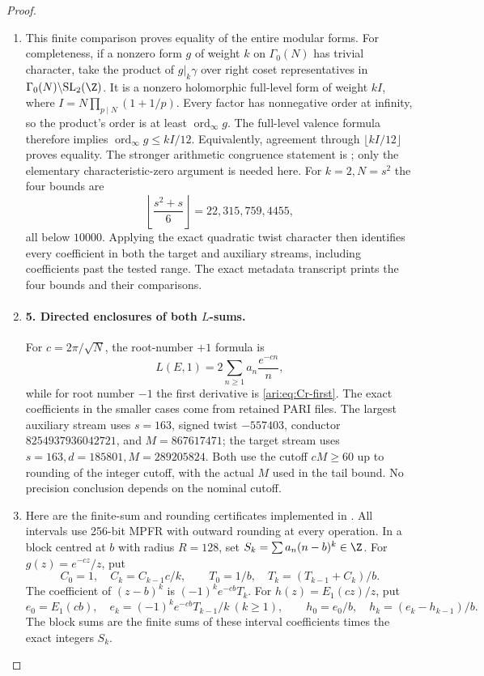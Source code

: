 \begin{proof}
\begin{enumerate}[label=\arabic*.,leftmargin=*]
\item This finite comparison proves equality of the entire modular forms.
For completeness, if a nonzero form $g$ of weight $k$ on
$\Gamma_0(N)$ has trivial character, take the product of
$g|_k\gamma$ over right coset representatives in
$\Gamma_0(N)\backslash\mathrm{SL}_2(\Z)$. It is a nonzero
holomorphic full-level form of weight $kI$, where
$I=N\prod_{p\mid N}(1+1/p)$. Every factor has nonnegative
order at infinity, so the product's order is at least
$\operatorname{ord}_\infty g$. The full-level valence formula
therefore implies $\operatorname{ord}_\infty g\leq kI/12$.
Equivalently, agreement through $\lfloor kI/12\rfloor$ proves
equality. The stronger arithmetic congruence statement is
\citet[Theorem 9.18]{CgzStein2007}; only the elementary
characteristic-zero argument is needed here. For $k=2,N=s^2$
the four bounds are
\[
 \left\lfloor\frac{s^2+s}{6}\right\rfloor
     =22,315,759,4455,
\]
all below $10000$. Applying the exact quadratic twist character
then identifies every coefficient in both the target and auxiliary
streams, including coefficients past the tested range. The exact
metadata transcript prints the four bounds and their comparisons.

\item \paragraph{5. Directed enclosures of both $L$-sums.}
For $c=2\pi/\sqrt N$, the root-number $+1$ formula is
\[
 L(E,1)=2\sum_{n\geq1}a_n\frac{e^{-cn}}n,
\]
while for root number $-1$ the first derivative is
\eqref{ari:eq:Cr-first}. The exact coefficients in the smaller cases
come from retained PARI files. The largest auxiliary stream uses
$s=163$, signed twist $-557403$, conductor
$8254937936042721$, and $M=867617471$; the target stream uses
$s=163,d=185801,M=289205824$. Both use the cutoff $cM\geq60$
up to rounding of the integer cutoff, with the actual $M$ used in
the tail bound. No precision conclusion depends on the nominal
cutoff.

\item Here are the finite-sum and rounding certificates implemented in
. All intervals use 256-bit
MPFR with outward rounding at every operation. In a block centred
at $b$ with radius $R=128$, set
$S_k=\sum a_n(n-b)^k\in\Z$. For $g(z)=e^{-cz}/z$, put
\[
 C_0=1,\quad C_k=C_{k-1}c/k,\qquad
 T_0=1/b,\quad T_k=(T_{k-1}+C_k)/b.
\]
The coefficient of $(z-b)^k$ is $(-1)^ke^{-cb}T_k$.
For $h(z)=E_1(cz)/z$, put
\[
 e_0=E_1(cb),\quad e_k=(-1)^ke^{-cb}T_{k-1}/k\ (k\geq1),
 \qquad h_0=e_0/b,\quad h_k=(e_k-h_{k-1})/b.
\]
The block sums are the finite sums of these interval coefficients
times the exact integers $S_k$.


\end{enumerate}
\end{proof}
